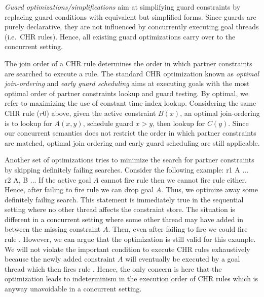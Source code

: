 \documentclass{tlp}
\begin{document}
{\em Guard optimizations/simplifications} aim at simplifying guard constraints by replacing
guard conditions with equivalent but simplified forms. Since guards are purely declarative, 
they are not influenced by concurrently executing goal threads (i.e.~CHR rules). Hence, all existing 
guard optimizations carry over to the concurrent setting.


The join order of a CHR rule determines the order in which partner constraints are searched
to execute a rule. The standard CHR optimization known as {\em optimal join-ordering} and 
{\em early guard scheduling} \cite{greg:thesis} aims at executing goals with the most optimal order of 
partner constraints lookup and guard testing. By optimal, we refer to maximizing the use of 
constant time index lookup. Considering the same CHR rule ($r0$) above, given the 
active constraint $B(x)$, an optimal join-ordering is to lookup for $A(x,y)$, schedule guard 
$x > y$, then lookup for $C(y)$. Since our concurrent semantics does not restrict the order 
in which partner constraints are matched, optimal join ordering and early guard scheduling are still
applicable.
 


Another set of optimizations tries to minimize the search for partner constraints by skipping 
definitely failing searches. Consider the following example:
 r1 \atsign A \simparrow ... \\
 r2 \atsign A, B \simparrow ...
\eda
If the active goal $A$ cannot fire rule  then we cannot fire rule  either.
Hence, after failing to fire rule  we can drop goal $A$. Thus, we optimize away
some definitely failing search.
This statement is immediately true in the sequential setting where no other thread affects the constraint store.
The situation is different in a concurrent setting
where some other thread may have added in between the missing constraint $A$.
Then, even after failing to fire  we could fire rule .
However, we can argue that the optimization is still valid for this example.
We will not violate the important condition to execute CHR rules exhaustively because
the newly added constraint $A$ will eventually be executed by a goal thread
which then fires rule . 
Hence, the only concern is here that the optimization leads to indeterminism
in the execution order of CHR rules which is anyway unavoidable in a concurrent setting.
\end{document}
